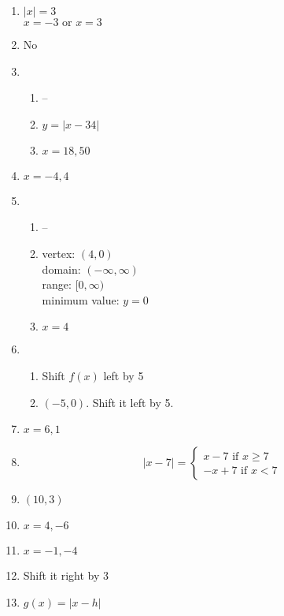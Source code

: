\documentclass{article}
\begin{document}
\begin{enumerate}
\item $|x| = 3$ \\
	$x = -3 \text{ or } x = 3$
	
\item No
	
\item

	\begin{enumerate}
	
	\item --
	
	\item $y = |x - 34|$
	
	\item $x = 18, 50$
	
	\end{enumerate}
	
\item $x = -4, 4$

\item

	\begin{enumerate}
	
	\item --
	
	\item vertex: $(4, 0)$ \\
		domain: $(-\infty, \infty)$ \\
		range: $[0, \infty)$ \\
		minimum value: $y = 0$
		
	\item $x = 4$
	
	\end{enumerate}
	
\item

	\begin{enumerate}
	
	\item Shift $f(x)$ left by 5
	
	\item $(-5,0)$. Shift it left by 5.
	
	\end{enumerate}
	
\item $x = 6, 1$
	
\item 
	\begin{equation*}
	|x -7| = \begin{cases}
	x - 7 \text{ if } x \geq 7 \\
	-x + 7 \text{ if } x < 7
	\end{cases}
	\end{equation*}
	
\item $(10,3)$

\item $x = 4, -6$

\item $x = -1, -4$

\item Shift it right by 3

\item $g(x) = |x - h|$
	
\end{enumerate}
\end{document}
